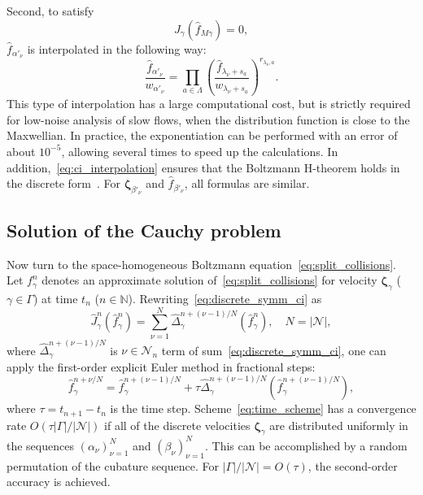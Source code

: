 \documentclass[10pt]{article}
\newcommand{\bzeta}{\boldsymbol{\zeta}}
\newcommand{\Nu}{\mathcal{N}}
\newcommand{\OO}[1]{O(#1)}
\begin{document}
Second, to satisfy
\begin{equation}\label{eq:strict_interpolation}
    J_\gamma\left(\hat{f}_{M\gamma}\right) = 0,
\end{equation}
\(\hat{f}_{\alpha'_\nu}\) is interpolated in the following way:
\begin{equation}\label{eq:ci_interpolation}
    \frac{\hat{f}_{\alpha'_\nu}}{w_{\alpha'_\nu}} = \prod_{a\in\Lambda}
        \left(\frac{\hat{f}_{\lambda_\nu+s_a}}{w_{\lambda_\nu+s_a}} \right)^{r_{\lambda_\nu,a}}.
\end{equation}
This type of interpolation has a large computational cost,
but is strictly required for low-noise analysis of slow flows,
when the distribution function is close to the Maxwellian.
In practice, the exponentiation can be performed with an error of about \(10^{-5}\),
allowing several times to speed up the calculations.
In addition,~\eqref{eq:ci_interpolation} ensures that
the Boltzmann H-theorem holds in the discrete form~\cite{Dodulad2013}.
For \(\bzeta_{\beta'_\nu}\) and \(\hat{f}_{\beta'_\nu}\), all formulas are similar.

\subsection{Solution of the Cauchy problem}

Now turn to the space-homogeneous Boltzmann equation~\eqref{eq:split_collisions}.
Let \(f_\gamma^n\) denotes an approximate solution of~\eqref{eq:split_collisions}
for velocity \(\bzeta_\gamma\) (\(\gamma\in\Gamma\)) at time \(t_n\) (\(n\in\mathbb{N}\)).
Rewriting~\eqref{eq:discrete_symm_ci} as
\begin{equation}\label{eq:discrete_short_ci}
    \hat{J}_\gamma^n\left(\hat{f}_\gamma^n\right) =
        \sum_{\nu=1}^N \hat{\Delta}_\gamma^{n+(\nu-1)/N} \left(\hat{f}_\gamma^n\right), \quad
    N=|\Nu|,
\end{equation}
where \(\hat{\Delta}_\gamma^{n+(\nu-1)/N}\) is \(\nu\in\Nu_n\) term of sum~\eqref{eq:discrete_symm_ci},
one can apply the first-order explicit Euler method in fractional steps:
\begin{equation}\label{eq:time_scheme}
    \hat{f}_\gamma^{n+\nu/N} = \hat{f}_\gamma^{n+(\nu-1)/N} + \tau \hat{\Delta}_\gamma^{n+(\nu-1)/N}
    \left(\hat{f}_\gamma^{n+(\nu-1)/N}\right),
\end{equation}
where \(\tau = t_{n+1} - t_n\) is the time step.
Scheme~\eqref{eq:time_scheme} has a convergence rate \(\OO{\tau|\Gamma|/|\Nu|}\)
if all of the discrete velocities \(\bzeta_\gamma\) are distributed uniformly
in the sequences \((\alpha_\nu)_{\nu=1}^N\) and \((\beta_\nu)_{\nu=1}^N\).
This can be accomplished by a random permutation of the cubature sequence.
For \(|\Gamma|/|\Nu| = \OO{\tau}\), the second-order accuracy is achieved.
\end{document}
